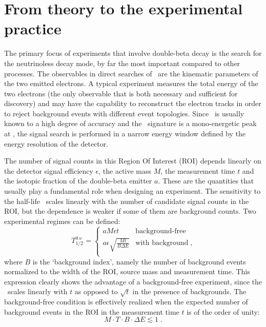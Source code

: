 \begin{table}
  \centering
  \caption{%
    Compilation of current experimental bounds at 90\% C.L.~on the Lorentz-violating \aof\
    coefficient from double-beta decay.
  }\label{tab:nbb:2nbblv-lim}
  
\end{table}

\section{From theory to the experimental practice}%
\label{sec:nbb:exp}

The primary focus of experiments that involve double-beta decay is the search for the
neutrinoless decay mode, by far the most important compared to other processes. The
observables in direct searches of \onbb\ are the kinematic parameters of the two emitted
electrons. A typical experiment measures the total energy of the two electrons (the only
observable that is both necessary and sufficient for discovery) and may have the
capability to reconstruct the electron tracks in order to reject background events with
different event topologies. Since \qbb\ is usually known to a high degree of accuracy and
the \onbb\ signature is a mono-energetic peak at \qbb, the signal search is performed in a
narrow energy window defined by the energy resolution of the detector.

The number of signal counts in this Region Of Interest (ROI) depends linearly on the
detector signal efficiency $\epsilon$, the active mass $M$, the measurement time $t$ and
the isotopic fraction of the double-beta emitter $a$.  These are the quantities that
usually play a fundamental role when designing an experiment. The sensitivity to the
half-life \thalfzero\ scales linearly with the number of candidate signal counts in the
ROI, but the dependence is weaker if some of them are background counts. Two experimental
regimes can be defined:
\begin{equation}\label{eq:nbb:bkglevel}
  T^{0\upnu}_{1/2} =
    \begin{cases}
      a M \epsilon t & \text{background-free} \\
      a \epsilon \sqrt{\frac{M t}{B \Delta{E}}} & \text{with background} \;, \\
    \end{cases}
\end{equation}
where $B$ is the `background index', namely the number of background events normalized to
the width of the ROI, source mass and measurement time. This expression clearly shows the
advantage of a background-free experiment, since the \thalfzero\ scales linearly with $t$
as opposed to $\sqrt{t}$ in the presence of backgrounds. The background-free condition is
effectively realized when the expected number of background events in the ROI in the
measurement time $t$ is of the order of unity:
\[
  M \cdot T \cdot B \cdot \Delta{E} \lesssim 1 \;.
\]

